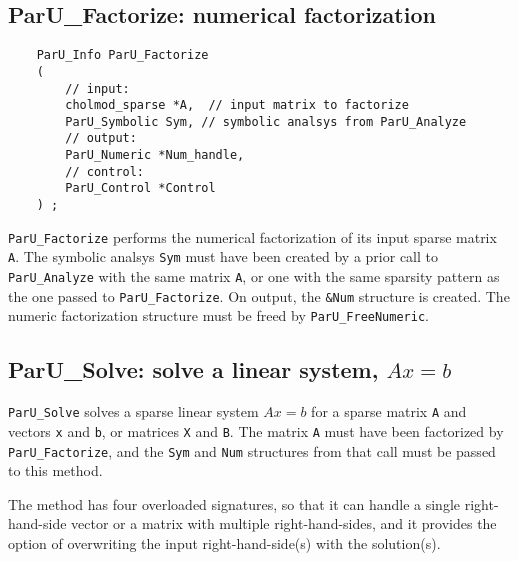 \documentclass[12pt]{article}
\begin{document}
\subsection{{\sf ParU\_Factorize}: numerical factorization}

    {\footnotesize
    \begin{verbatim}
    ParU_Info ParU_Factorize
    (
        // input:
        cholmod_sparse *A,  // input matrix to factorize
        ParU_Symbolic Sym, // symbolic analsys from ParU_Analyze
        // output:
        ParU_Numeric *Num_handle,
        // control:
        ParU_Control *Control
    ) ; \end{verbatim}}

    \verb'ParU_Factorize' performs the numerical factorization of its input
    sparse matrix \verb'A'.  The symbolic analsys \verb'Sym' must have been
    created by a prior call to \verb'ParU_Analyze' with the same matrix
    \verb'A', or one with the same sparsity pattern as the one passed to
    \verb'ParU_Factorize'.  On output, the \verb'&Num' structure is created.
    The numeric factorization structure must be freed by
    \verb'ParU_FreeNumeric'.

\subsection{{\sf ParU\_Solve}: solve a linear system, $Ax=b$}

    \verb'ParU_Solve' solves a sparse linear system $Ax=b$ for a sparse
    matrix \verb'A' and vectors \verb'x' and \verb'b', or matrices
    \verb'X' and \verb'B'.  The matrix \verb'A' must have been factorized
    by \verb'ParU_Factorize', and the \verb'Sym' and \verb'Num' structures
    from that call must be passed to this method.

    The method has four overloaded signatures, so that it can handle a single
    right-hand-side vector or a matrix with multiple right-hand-sides, and it
    provides the option of overwriting the input right-hand-side(s) with the
    solution(s).
\end{document}
